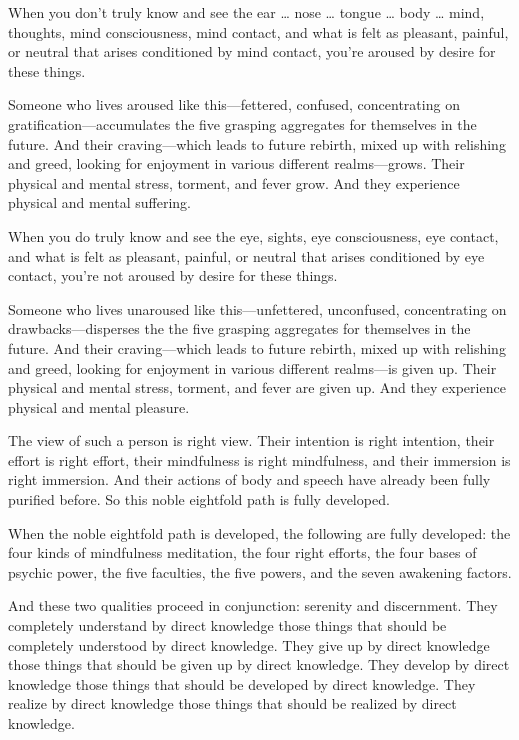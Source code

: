 \documentclass[12pt,openany]{book}%
\begin{document}
When you don’t truly know and see the ear … nose … tongue … body … mind, thoughts, mind consciousness, mind contact, and what is felt as pleasant, painful, or neutral that arises conditioned by mind contact, you’re aroused by desire for these things. 

Someone who lives aroused like this—fettered, confused, concentrating on gratification—accumulates the five grasping aggregates for themselves in the future. And their craving—which leads to future rebirth, mixed up with relishing and greed, looking for enjoyment in various different realms—grows. Their physical and mental stress, torment, and fever grow. And they experience physical and mental suffering. 

When you do truly know and see the eye, sights, eye consciousness, eye contact, and what is felt as pleasant, painful, or neutral that arises conditioned by eye contact, you’re not aroused by desire for these things. 

Someone who lives unaroused like this—unfettered, unconfused, concentrating on drawbacks—disperses the the five grasping aggregates for themselves in the future. And their craving—which leads to future rebirth, mixed up with relishing and greed, looking for enjoyment in various different realms—is given up. Their physical and mental stress, torment, and fever are given up. And they experience physical and mental pleasure. 

The view of such a person is right view. Their intention is right intention, their effort is right effort, their mindfulness is right mindfulness, and their immersion is right immersion. And their actions of body and speech have already been fully purified before. So this noble eightfold path is fully developed. 

When the noble eightfold path is developed, the following are fully developed: the four kinds of mindfulness meditation, the four right efforts, the four bases of psychic power, the five faculties, the five powers, and the seven awakening factors. 

And these two qualities proceed in conjunction: serenity and discernment. They completely understand by direct knowledge those things that should be completely understood by direct knowledge. They give up by direct knowledge those things that should be given up by direct knowledge. They develop by direct knowledge those things that should be developed by direct knowledge. They realize by direct knowledge those things that should be realized by direct knowledge. 
\end{document}
